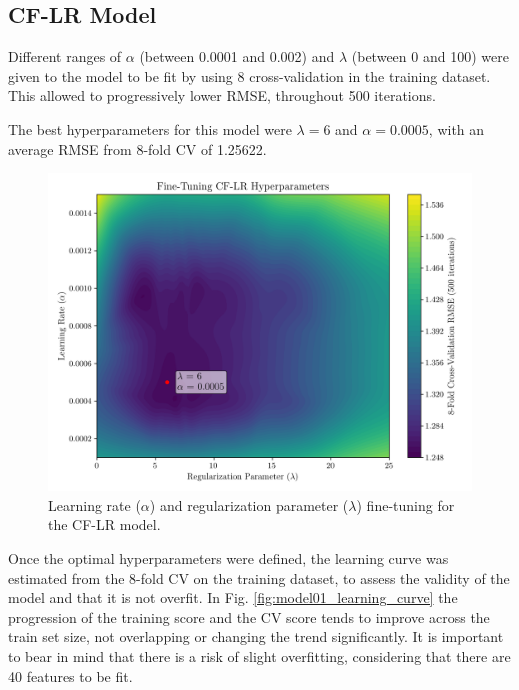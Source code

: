 \documentclass[conference]{IEEEtran}
\begin{document}
\subsection{CF-LR Model}

Different ranges of $\alpha$ (between 0.0001 and 0.002) and $\lambda$ (between 0 and 100) were given to the model to be fit by using 8 cross-validation in the training dataset. This allowed to progressively lower RMSE, throughout 500 iterations.

The best hyperparameters for this model were $\lambda = 6$ and $\alpha = 0.0005$, with an average RMSE from 8-fold CV of 1.25622.

\begin{figure}[H]
    \centering
    \includegraphics[width=1\linewidth]{assets/model01_hyperparametres.png}
    \caption{Learning rate ($\alpha$) and regularization parameter ($\lambda$) fine-tuning for the CF-LR model.}
    \label{fig:model01_hyperparametres}
\end{figure}

Once the optimal hyperparameters were defined, the learning curve was estimated from the 8-fold CV on the training dataset, to assess the validity of the model and that it is not overfit. In Fig. \ref{fig:model01_learning_curve} the progression of the training score and the CV score tends to improve across the train set size, not overlapping or changing the trend significantly. It is important to bear in mind that there is a risk of slight overfitting, considering that there are 40 features to be fit.
\end{document}
